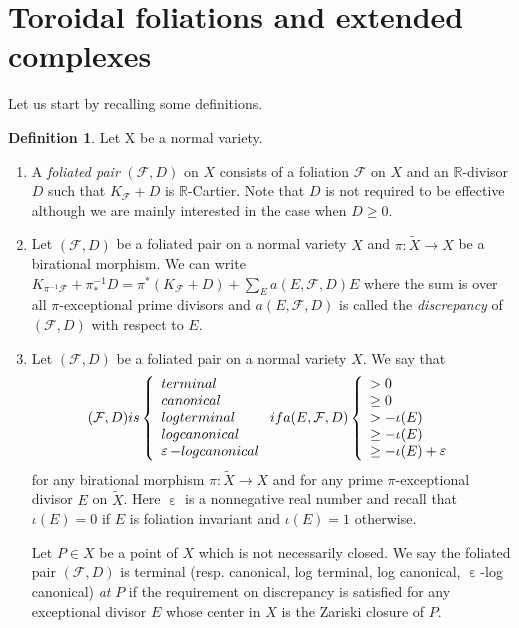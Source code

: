 \documentclass[12pt,reqno]{amsart}
\DeclareMathOperator{\ve}{\varepsilon}
\theoremstyle{definition}
\newtheorem{definition}[theorem]{Definition}
\newcommand{\mb}{\mathbb}
\newcommand\cF{{\mathcal{F}}}
\newcommand\bR{{\mathbb R}}
\begin{document}
\section{Toroidal foliations and extended complexes}\label{sec:toroidal_foliation}

Let us start by recalling some definitions.
\begin{definition}
Let X be a normal variety.
\begin{enumerate}
    \item A \emph{foliated pair} $(\cF, D)$ on $X$ consists of a foliation $\cF$ on $X$ and an $\bR$-divisor $D$ such that $K_\cF+D$ is $\mb R$-Cartier. 
    Note that $D$ is not required to be effective although we are mainly interested in the case when $D\geq 0$. 
    \item Let $(\cF,D)$ be a foliated pair on a normal variety $X$ and $\pi\colon \widetilde{X}\to X$ be a birational morphism. We can write
    $K_{\pi^{-1}\cF}+\pi_*^{-1}D=\pi^*(K_\cF+D)+\sum_{E} a(E,\cF,D)E$ 
    where the sum is over all $\pi$-exceptional prime divisors and $a(E,\cF,D)$ is called the \emph{discrepancy} of $(\cF,D)$ with respect to $E$. 
    \item Let $(\cF,D)$ be a foliated pair on a normal variety $X$. 
    We say that 
    \[(\cF,D) \textnormal{ is } \left\{\begin{array}{l}
        \textnormal{terminal} \\
        \textnormal{canonical} \\
        \textnormal{log terminal} \\
        \textnormal{log canonical} \\
        \ve\textnormal{-log canonical} 
    \end{array}\right.
    \textnormal{if } a(E,\cF,D) 
    \left\{\begin{array}{l}
        >0 \\
        \geq 0\\
        >-\iota(E)\\
        \geq -\iota(E)\\
        \geq -\iota(E)+\ve
    \end{array}\right.
    \]
    for any birational morphism $\pi \colon \widetilde X \to X$ and for any prime $\pi$-exceptional divisor $E$ on $\widetilde X$. 
    Here $\ve$ is a nonnegative real number and recall that $\iota(E)=0$ if $E$ is foliation invariant and $\iota(E)=1$ otherwise. 

    Let $P\in X$ be a point of $X$ which is not necessarily closed. 
    We say the foliated pair $(\cF,D)$ is terminal (resp. canonical, log terminal, log canonical, $\ve$-log canonical) \emph{at} $P$ if the requirement on discrepancy is satisfied for any exceptional divisor $E$ whose center in $X$ is the Zariski closure of $P$.
    

\end{enumerate}
\end{definition}
\end{document}
